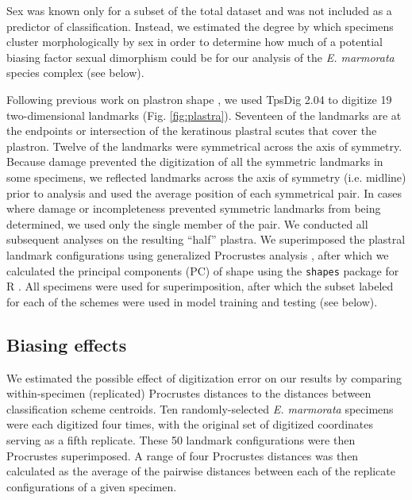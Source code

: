 \documentclass[11pt]{article}
\begin{document}
Sex was known only for a subset of the total dataset and was not included as a predictor of classification. Instead, we estimated the degree by which specimens cluster morphologically by sex in order to determine how much of a potential biasing factor sexual dimorphism could be for our analysis of the \textit{E. marmorata} species complex (see below).

Following previous work on plastron shape \citep{Angielczyk2007,Angielczyk2011,Angielczyk2013a}, we used TpsDig 2.04 \citep{Rohlf2005} to digitize 19 two-dimensional landmarks (Fig. \ref{fig:plastra}). Seventeen of the landmarks are at the endpoints or intersection of the keratinous plastral scutes that cover the plastron. Twelve of the landmarks were symmetrical across the axis of symmetry. Because damage prevented the digitization of all the symmetric landmarks in some specimens, we reflected landmarks across the axis of symmetry (i.e. midline) prior to analysis and used the average position of each symmetrical pair. In cases where damage or incompleteness prevented symmetric landmarks from being determined, we used only the single member of the pair. We conducted all subsequent analyses on the resulting ``half'' plastra. We superimposed the plastral landmark configurations using generalized Procrustes analysis \citep{Dryden1998a}, after which we calculated the principal components (PC) of shape using the \texttt{shapes} package for R \citep{R2016,Dryden2013}. All specimens were used for superimposition, after which the subset labeled for each of the schemes were used in model training and testing (see below).


\subsection*{Biasing effects}
We estimated the possible effect of digitization error \citep{Arnqvist1998,Cramon2007,Munoz-MunozF.2010} on our results by comparing within-specimen (replicated) Procrustes distances to the distances between classification scheme centroids. Ten randomly-selected \textit{E. marmorata} specimens were each digitized four times, with the original set of digitized coordinates serving as a fifth replicate. These 50 landmark configurations were then Procrustes superimposed. A range of four Procrustes distances was then calculated as the average of the pairwise distances between each of the replicate configurations of a given specimen.
\end{document}
